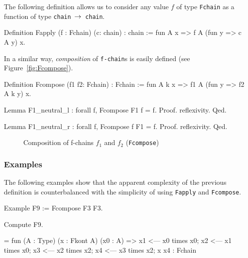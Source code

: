 The following definition allows us to consider any value {$f$} 
of type 
\texttt{Fchain} as a function of type \texttt{chain $\mbox{$\rightarrow$}$ chain}.


\begin{Coqsrc}
Definition Fapply (f : Fchain) (c: chain) : chain  :=
 fun A  x =>  f  A (fun y => c A  y) x.
\end{Coqsrc}

In a similar way, \emph{composition} of \texttt{f-chain}s is easily defined
(see Figure~\vref{fig:Fcompose}).


\begin{Coqsrc}
Definition Fcompose (f1 f2: Fchain) : Fchain  :=
 fun   A k x =>  f1  A (fun y => f2 A k y) x.

Lemma F1_neutral_l : forall f, Fcompose F1 f = f.
Proof. reflexivity. Qed.

Lemma F1_neutral_r : forall f, Fcompose f F1 = f.
Proof. reflexivity. Qed.
\end{Coqsrc}

\begin{figure}[h]
  \centering
  \caption{Composition  of f-chains $f_1$ and $f_2$ (\texttt{Fcompose})}
  \label{fig:Fcompose}
\end{figure}
\subsubsection{Examples}

The following examples show that the apparent complexity of the previous 
definition is counterbalanced with the simplicity of using \texttt{Fapply}
and \texttt{Fcompose}.

\begin{Coqsrc}
Example F9 := Fcompose F3 F3.

Compute F9.
\end{Coqsrc}

\begin{Coqanswer}
= fun (A : Type) (x : Fkont A) (x0 : A) =>
       x1 <--- x0 times x0;
       x2 <--- x1 times x0; x3 <--- x2 times x2; 
       x4 <--- x3 times x2; 
       x x4
     : Fchain  
\end{Coqanswer}

